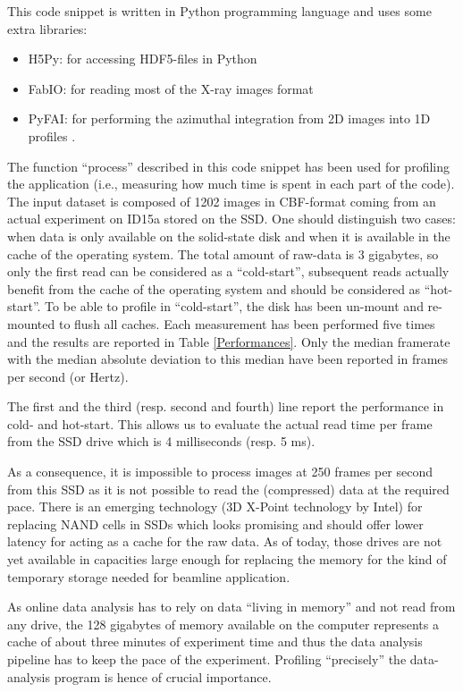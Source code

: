 \documentclass[preprint]{iucr}              %
\begin{document}
This code snippet is written in Python programming language \cite{python} and
uses some extra libraries:
\begin{itemize}
  \item {H5Py}: for accessing HDF5-files in Python
  \cite{h5py}
  \item{FabIO}: for reading most of the X-ray images format
  \cite{fabio}
  \item{PyFAI}: for performing the azimuthal
  integration from 2D images into 1D profiles \cite{pyFAI}. 
\end{itemize}

The function ``process'' described in this code snippet has been used for
profiling the application (i.e., measuring how much time is spent in each
part of the code).
The input dataset is composed of 1202 images in CBF-format coming from an actual
experiment on ID15a stored on the SSD.
One should distinguish two cases: when data is only available on the
solid-state disk and when it is available in the cache of the
operating system.
The total amount of raw-data is 3 gigabytes, so only the first read can be
considered as a ``cold-start'', subsequent reads actually benefit from
the cache of the operating system and should be considered as ``hot-start''.
To be able to profile in ``cold-start'', the disk has been un-mount and re-mounted
to flush all caches.
Each measurement has been performed five times and the results are reported in
Table \ref{Performances}.  Only the median framerate  with the median absolute
deviation to this median have been reported in frames per second (or Hertz).

The first and the third (resp. second and fourth) line report the performance
in cold- and hot-start.
This allows us to evaluate the actual read time per frame from the SSD
drive which is 4 milliseconds (resp. 5 ms).

As a consequence, it is impossible to process images at 250 frames per
second from this SSD as it is not possible to read the (compressed) data
at the required pace.
There is an emerging technology (3D X-Point technology by Intel) for replacing
NAND cells in SSDs which looks promising and should offer
lower latency for acting as a cache for the raw data. 
As of today, those drives are not yet available in capacities large
enough for replacing the memory for the kind of temporary storage needed for
beamline application.

As online data analysis has to rely on data ``living in memory'' and not
read from any drive, the 128 gigabytes of memory available on the computer
represents a cache of about three minutes of experiment time and thus the data
analysis pipeline has to keep the pace of the experiment. 
Profiling ``precisely'' the data-analysis program is hence of crucial
importance.
\end{document}
